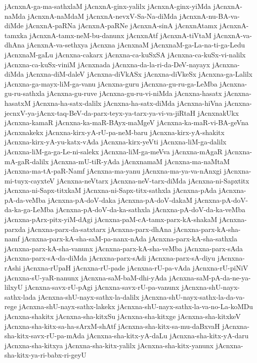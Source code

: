 {jAcnxnA-ga-ma-sathxlaM
jAcnxnA-ginx-yalilx
jAcnxnA-ginx-yiMda
jAcnxnA-naMda
jAcnxnA-naMdaM
jAcnxnA-nevxV-Sa-Na-diMda
jAcnxnA-nu-BA-va-diMde
jAcnxnA-paRNa
jAcnxnA-paRNe
jAcnxnA-sinA
jAcnxnAtamx
jAcnxnA-tamxka
jAcnxnA-tamx-neM-bu-danunx
jAcnxnAtf
jAcnxnA-tiVtaM
jAcnxnA-va-dhAna
jAcnxnA-va-sethxya
jAcnxna
jAcnxnaM
jAcnxnaM-ga-La-na-ti-ga-Ledu
jAcnxnaM-gaLu
jAcnxna-cakarx
jAcnxna-ca-kuSxSA
jAcnxna-ca-kuSx-vi-nalilx
jAcnxna-ca-kuSx-viniM
jAcnxnada
jAcnxna-da-la-ri-da-DeV-nayayx
jAcnxna-diMda
jAcnxna-diM-daleV
jAcnxna-diVkASx
jAcnxna-diVkeSx
jAcnxna-ga-Lalilx
jAcnxna-ga-mayx-liM-ga-vanu
jAcnxna-guru
jAcnxna-gu-ru-ga-LeMba
jAcnxna-gu-ru-sathxla
jAcnxna-gu-ruve
jAcnxna-gu-ru-vi-niMda
jAcnxna-hasatx
jAcnxna-hasatxM
jAcnxna-ha-satx-dalilx
jAcnxna-ha-satx-diMda
jAcnxna-hiVna
jAcnxna-jecnxV-ya-jAcnx-taq-BeV-da-parx-teyx-ya-tarx-ya-vi-va-jiRtaH
jAcnxnakUkx
jAcnxna-kamaR
jAcnxna-ka-maR-BAyx-maMgeV
jAcnxna-ka-maR-vi-BA-geVna
jAcnxnakekx
jAcnxna-kirx-yA-rU-pa-neM-baru
jAcnxna-kirx-yA-shakitx
jAcnxna-kirx-yA-yu-katx-vAda
jAcnxna-kirx-yeVti
jAcnxna-liM-ga-dalilx
jAcnxna-liM-ga-ga-Le-ni-salekx
jAcnxna-liM-ga-meVva
jAcnxna-mAgaR
jAcnxna-mA-gaR-dalilx
jAcnxna-mU-tiR-yAda
jAcnxnamaM
jAcnxna-ma-naMtaM
jAcnxna-ma-tA-paR-Namf
jAcnxna-ma-yanu
jAcnxna-ma-ya-va-nAnxgi
jAcnxna-mi-tuyx-cayxteV
jAcnxna-neVtarx
jAcnxna-neV-tarx-diMda
jAcnxna-ni-Sapxtitx
jAcnxna-ni-Sapx-titxkaM
jAcnxna-ni-Sapx-titx-sathxla
jAcnxna-pAda
jAcnxna-pA-da-veMba
jAcnxna-pA-doV-daka
jAcnxna-pA-doV-dakaM
jAcnxna-pA-doV-da-ka-ga-LeMba
jAcnxna-pA-doV-da-ka-sathxla
jAcnxna-pA-doV-da-ka-veMba
jAcnxna-pArx-pitx-yiM-dAgi
jAcnxna-paM-cA-tamx-parx-kA-shakaM
jAcnxna-parxda
jAcnxna-parx-da-satxtarx
jAcnxna-parx-dhAna
jAcnxna-parx-kA-sha-namf
jAcnxna-parx-kA-sha-saM-pa-nanx-nAda
jAcnxna-parx-kA-sha-sathxla
jAcnxna-parx-kA-sha-vanunx
jAcnxna-parx-kA-sha-veMba
jAcnxna-parx-sAda
jAcnxna-parx-sA-da-diMda
jAcnxna-parx-sAdi
jAcnxna-parx-sA-diyu
jAcnxna-rAshi
jAcnxna-rUpaH
jAcnxna-rU-pade
jAcnxna-rU-pa-vAda
jAcnxna-rU-piNiV
jAcnxna-sU-yaR-nanunx
jAcnxna-saM-baM-dhi-yAda
jAcnxna-saM-pA-da-ne-ya-lilxyU
jAcnxna-savx-rU-pAgi
jAcnxna-savx-rU-pa-vanunx
jAcnxna-shU-nayx-sathx-lada
jAcnxna-shU-nayx-sathx-la-dalilx
jAcnxna-shU-nayx-sathx-la-da-va-rege
jAcnxna-shU-nayx-sathx-lakekx
jAcnxna-shU-nayx-sathx-la-va-no-La-koMDu
jAcnxna-shakitx
jAcnxna-sha-kitxSu
jAcnxna-sha-kitxge
jAcnxna-sha-kitxkeV
jAcnxna-sha-kitx-sa-ha-sArxM-shAtf
jAcnxna-sha-kitx-sa-mu-daBxvaH
jAcnxna-sha-kitx-savx-rU-pa-mAda
jAcnxna-sha-kitx-yA-daLu
jAcnxna-sha-kitx-yA-daru
jAcnxna-sha-kitxya
jAcnxna-sha-kitx-yalilx
jAcnxna-sha-kitx-yanunx
jAcnxna-sha-kitx-ya-ri-babx-ri-geyU
}
